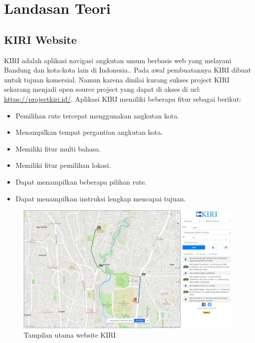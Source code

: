 \chapter{Landasan Teori}
\label{chap:teori}

\section{KIRI Website }
\label{sec:KIRI} 
KIRI adalah aplikasi navigasi angkutan umum berbasis web yang melayani Bandung dan kota-kota lain di Indonesia.\cite{pascal:17:KIRI}.
Pada awal pembuatannya KIRI dibuat untuk tujuan komersial. Namun karena dinilai kurang sukses project KIRI sekarang menjadi open source project yang dapat di akses di url: \url{https://projectkiri.id/}. Aplikasi KIRI memiliki beberapa fitur sebagai berikut:
\begin{itemize}
    \item Pemilihan rute tercepat menggunakan angkutan kota.
    \item Menampilkan tempat pergantian angkutan kota.
    \item Memiliki fitur multi bahasa.
    \item Memiliki fitur pemilihan lokasi.
    \item Dapat menampilkan beberapa pilihan rute.
    \item Dapat menampilkan instruksi lengkap  mencapai tujuan.
\end{itemize}

\begin{figure}[H]
    \centering
    \includegraphics[scale=0.3]{Gambar/kiri-example-1}
    \caption{Tampilan utama website KIRI}
    \label{fig:my_label}
\end{figure}




